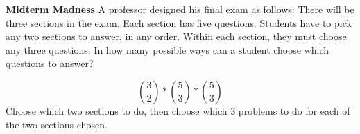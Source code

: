 \question \textbf{Midterm Madness}\newline
A professor designed his final exam as follows: There will be three sections in the exam. Each section has five questions. Students have to pick any two sections to answer, in any order. Within each section, they must choose any three questions. In how many possible ways can a student choose which questions to answer?
\begin{solution}
\[{3 \choose 2} * {5 \choose 3} * {5 \choose 3} \]
Choose which two sections to do, then choose which 3 problems to do for each of the two sections chosen.
\end{solution}